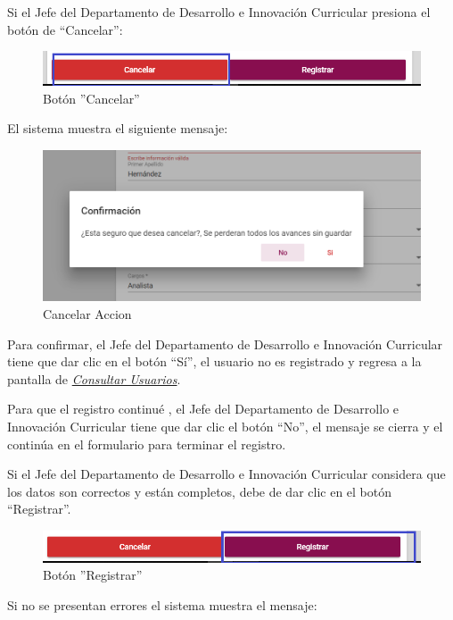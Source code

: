 \newpage
Si el Jefe del Departamento de Desarrollo e Innovación Curricular presiona el botón de “Cancelar”:

\begin{figure}[H]
	\centering
	\hypertarget{cancel1-JDDIC}{\includegraphics[width=0.7\linewidth]{images/SP5/BtnCancelar1}}
	\caption{Botón ''Cancelar''}
	\label{cancel1-JDDIC}
\end{figure}

El sistema muestra el siguiente mensaje:


\begin{figure}[H]
	\centering
	\includegraphics[width=0.4\linewidth]{images/SP5/MSG29}
	\caption{Cancelar Accion}
	\label{mensaje29-JDDIC}
\end{figure}

Para confirmar, el Jefe del Departamento de Desarrollo e Innovación Curricular tiene que dar clic en el botón “Sí”, el usuario no es registrado y regresa a la pantalla de \hyperlink{consultarUs-JDDIC}{\textit{Consultar Usuarios}}.

Para que el registro continué , el Jefe del Departamento de Desarrollo e Innovación Curricular tiene que  dar clic el botón “No”, el mensaje se  cierra  y el continúa en el formulario para terminar el registro.

Si el Jefe del Departamento de Desarrollo e Innovación Curricular considera que los datos son correctos y están completos, debe de dar clic en el botón “Registrar”.

\begin{figure}[H]
	\centering
	\hypertarget{btnreg-JDDIC}{\includegraphics[width=0.7\linewidth]{images/SP5/BtnRegistrar}}
	\caption{Botón ''Registrar''}
	\label{btnreg-JDDIC}
\end{figure}

Si no se presentan errores el sistema muestra el mensaje:


